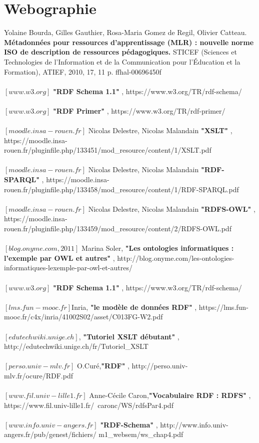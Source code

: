 \documentclass{article}
\begin{document}
\section{Webographie}
\normalsize
Yolaine Bourda, Gilles Gauthier, Rosa-Maria Gomez de Regil, Olivier Catteau. \textbf{Métadonnées pour
ressources d’apprentissage (MLR) : nouvelle norme ISO de description de ressources pédagogiques.}
STICEF (Sciences et Technologies de l’Information et de la Communication pour l’Éducation et la
Formation), ATIEF, 2010, 17, 11 p. ffhal-00696450f\\
\\
$[www.w3.org]$ \textbf{"RDF Schema 1.1"}
, https://www.w3.org/TR/rdf-schema/\\
\\
$[www.w3.org]$ \textbf{"RDF Primer"}
, https://www.w3.org/TR/rdf-primer/\\
\\
$[moodle.insa-rouen.fr]$ Nicolas Delestre, Nicolas Malandain \textbf{"XSLT"}
, https://moodle.insa-rouen.fr/pluginfile.php/133451/mod\_resource/content/1/XSLT.pdf\\
\\
$[moodle.insa-rouen.fr]$ Nicolas Delestre, Nicolas Malandain \textbf{"RDF-SPARQL"}
, https://moodle.insa-rouen.fr/pluginfile.php/133458/mod\_resource/content/1/RDF-SPARQL.pdf\\
\\
$[moodle.insa-rouen.fr]$ Nicolas Delestre, Nicolas Malandain \textbf{"RDFS-OWL"}
, https://moodle.insa-rouen.fr/pluginfile.php/133459/mod\_resource/content/2/RDFS-OWL.pdf\\
\\
$[blog.onyme.com,2011]$ Marina Soler, \textbf{"Les ontologies informatiques : l'exemple par OWL et autres"}
, http://blog.onyme.com/les-ontologies-informatiques-lexemple-par-owl-et-autres/\\
\\
$[www.w3.org]$ \textbf{"RDF Schema 1.1"}
, https://www.w3.org/TR/rdf-schema/\\
\\
$[lms.fun-mooc.fr]$Inria, \textbf{"le modèle de données RDF"}
, https://lms.fun-mooc.fr/c4x/inria/41002S02/asset/C013FG-W2.pdf\\
\\
$[edutechwiki.unige.ch]$, \textbf{"Tutoriel XSLT débutant"}
, http://edutechwiki.unige.ch/fr/Tutoriel\_XSLT\\
\\
$[perso.univ-mlv.fr]$ O.Curé,\textbf{"RDF"}
, http://perso.univ-mlv.fr/ocure/RDF.pdf\\
\\
$[www.fil.univ-lille1.fr]$ Anne-Cécile Caron,\textbf{"Vocabulaire RDF : RDFS"}
, https://www.fil.univ-lille1.fr/~caronc/WS/rdfsPar4.pdf\\
\\
$[www.info.univ-angers.fr]$ \textbf{"RDF-Schema"}
, http://www.info.univ-angers.fr/pub/genest/fichiers/
m1\_websem/ws\_chap4.pdf\\
\end{document}

